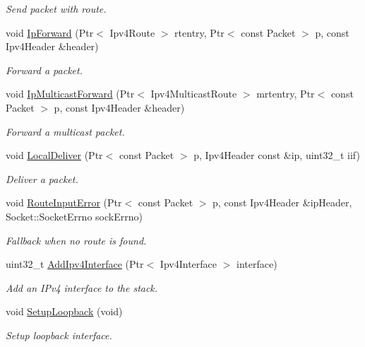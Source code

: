 \begin{DoxyCompactItemize}
\begin{DoxyCompactList}\small\item\em Send packet with route. \end{DoxyCompactList}\item 
void \hyperlink{classns3_1_1Ipv4RouterL3Protocol_a85559a2c92f1c2ff3d80a1228ca6b634}{Ip\-Forward} (Ptr$<$ Ipv4\-Route $>$ rtentry, Ptr$<$ const Packet $>$ p, const Ipv4\-Header \&header)
\begin{DoxyCompactList}\small\item\em Forward a packet. \end{DoxyCompactList}\item 
void \hyperlink{classns3_1_1Ipv4RouterL3Protocol_a7cfc75feda36ad3c0c11cd5bf92e63f2}{Ip\-Multicast\-Forward} (Ptr$<$ Ipv4\-Multicast\-Route $>$ mrtentry, Ptr$<$ const Packet $>$ p, const Ipv4\-Header \&header)
\begin{DoxyCompactList}\small\item\em Forward a multicast packet. \end{DoxyCompactList}\item 
void \hyperlink{classns3_1_1Ipv4RouterL3Protocol_a89499fe56b8b356bb2190d311cf2a43c}{Local\-Deliver} (Ptr$<$ const Packet $>$ p, Ipv4\-Header const \&ip, uint32\-\_\-t iif)
\begin{DoxyCompactList}\small\item\em Deliver a packet. \end{DoxyCompactList}\item 
void \hyperlink{classns3_1_1Ipv4RouterL3Protocol_a96be298c33d8b9ebc2696d24b953cf4b}{Route\-Input\-Error} (Ptr$<$ const Packet $>$ p, const Ipv4\-Header \&ip\-Header, Socket\-::\-Socket\-Errno sock\-Errno)
\begin{DoxyCompactList}\small\item\em Fallback when no route is found. \end{DoxyCompactList}\item 
uint32\-\_\-t \hyperlink{classns3_1_1Ipv4RouterL3Protocol_a52bc289137d131894c462f1ea4089a36}{Add\-Ipv4\-Interface} (Ptr$<$ Ipv4\-Interface $>$ interface)
\begin{DoxyCompactList}\small\item\em Add an I\-Pv4 interface to the stack. \end{DoxyCompactList}\item 
void \hyperlink{classns3_1_1Ipv4RouterL3Protocol_ae038fa89483a01c2a8d1adc3d54dede6}{Setup\-Loopback} (void)
\begin{DoxyCompactList}\small\item\em Setup loopback interface. \end{DoxyCompactList}\item 

\end{DoxyCompactItemize}
